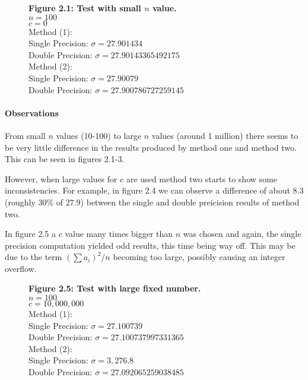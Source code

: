 \documentclass[12pt]{article}
\begin{document}
\begin{figure}[h]
	\textbf{Figure 2.1: Test with small $n$ value.}\\
	$n=100$\\
	$c=0$\\
	
	Method (1):\\
	Single Precision: $\sigma=27.901434$\\
	Double Precision: $\sigma=27.90143365492175$\\
	
	Method (2):\\
	Single Precision: $\sigma=27.90079$\\
	Double Precision: $\sigma=27.900786727259145$
\end{figure}

\paragraph{Observations} From small $n$ values (10-100) to large $n$ values (around 1 million) there seems to be very little difference in the results produced by method one and method two. This can be seen in figures 2.1-3.

However, when large values for $c$ are used method two starts to show some inconsistencies. For example, in figure 2.4 we can observe a difference of about 8.3 (roughly 30\% of 27.9) between the single and double preicision results of method two. 

In figure 2.5 a $c$ value many times bigger than $n$ was chosen and again, the single precision computation yielded odd results, this time being way off. This may be due to the term $(\sum a_{i})^2/n$ becoming too large, possibly causing an integer overflow.

\begin{figure}[h]
	\textbf{Figure 2.5: Test with large fixed number.}\\
	$n=100$\\
	$c=10,000,000$\\
	
	Method (1):\\
	Single Precision: $\sigma=27.100739$\\
	Double Precision: $\sigma=27.100737997331365$\\
	
	Method (2):\\
	Single Precision: $\sigma=3,276.8$\\
	Double Precision: $\sigma=27.092065259038485$
\end{figure}
\end{document}
